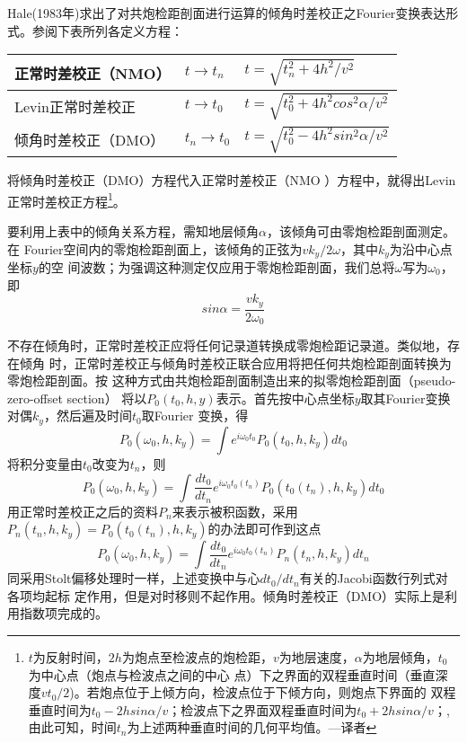 Hale(1983年)求出了对共炮检距剖面进行运算的倾角时差校正之Fourier变换表达形
式。参阅下表所列各定义方程：
\begin{table}[!ht]
\centering
\ttfamily
\small
\begin{tabularx}{\textwidth}{|Y|Y|Y|}
\hline
正常时差校正（NMO）& $t\rightarrow t_n$ & $t=\sqrt{t_n^2+4h^2/v^2}$\\
\hline
Levin正常时差校正& $t\rightarrow t_0$ & $t=\sqrt{t_0^2+4h^2cos^2\alpha/v^2}$\\
\hline
倾角时差校正（DMO）& $t_n\rightarrow t_0$ & $t=\sqrt{t_0^2-4h^2sin^2\alpha/v^2}$\\
\hline
\end{tabularx}
\end{table}
将倾角时差校正（DMO）方程代入正常时差校正（NMO
）方程中，就得出Levin正常时差校正方程\footnote{
$t$为反射时间，$2h$为炮点至检波点的炮检距，$v$为地层速度，$\alpha$为地层倾角，$t_0$为中心点（炮点与检波点之间的中心
点）下之界面的双程垂直时间（垂直深度$vt_0/2$)。若炮点位于上倾方向，检波点位于下倾方向，则炮点下界面的
双程垂直时间为$t_0-2hsin\alpha/v$；检波点下之界面双程垂直时间为$t_0+2hsin\alpha/v$；,由此可知，时间$t_n$为上述两种垂直时间的几何平均值。---译者
}。

要利用上表中的倾角关系方程，需知地层倾角$\alpha$，该倾角可由零炮检距剖面测定。在
Fourier空间内的零炮检距剖面上，该倾角的正弦为$vk_y/2\omega$，其中$k_y$为沿中心点坐标$y$的空
间波数；为强调这种测定仅应用于零炮检距剖面，我们总将$\omega$写为$\omega_0$，即
\begin{equation}
sin\alpha = \frac{vk_y}{2\omega_0}
\label{eq:ex3.6.3}
\end{equation}

不存在倾角时，正常时差校正应将任何记录道转换成零炮检距记录道。类似地，存在倾角
时，正常时差校正与倾角时差校正联合应用将把任何共炮检距剖面转换为零炮检距剖面。按
这种方式由共炮检距剖面制造出来的拟零炮检距剖面（pseudo-zero-offset section）
将以$P_0(t_0,h,y)$表示。首先按中心点坐标$y$取其Fourier变换对偶$k_y$，然后遍及时间$t_0$取Four­ier
变换，得
\begin{equation}
P_0(\omega_0,h,k_y)=\int e^{i\omega_0t_0}P_0(t_0,h,k_y)dt_0
\label{eq:ex3.6.4}
\end{equation}
将积分变量由$t_0$改变为$t_n$，则
\begin{equation}
P_0(\omega_0,h,k_y)=\int \frac{dt_0}{dt_n}e^{i\omega_0t_0(t_n)}P_0(t_0(t_n),h,k_y)dt_0
\label{eq:ex3.6.5}
\end{equation}
用正常时差校正之后的资料$P_n$来表示被积函数，采用$P_n(t_n,h,k_y)=P_0(t_0(t_n),h,k_y)$的办法即可作到这点
\begin{equation}
P_0(\omega_0,h,k_y)=\int \frac{dt_0}{dt_n}e^{i\omega_0t_0(t_n)}P_n(t_n,h,k_y)dt_n
\label{eq:ex3.6.6}
\end{equation}
同采用Stolt偏移处理时一样，上述变换中与心$dt_0/dt_n$有关的Jacobi函数行列式对各项均起标
定作用，但是对时移则不起作用。倾角时差校正（DMO）实际上是利用指数项完成的。

